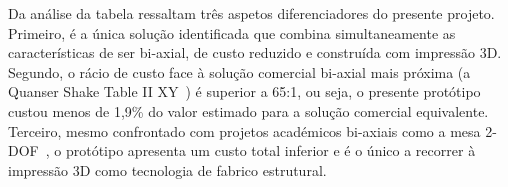 Da análise da tabela ressaltam três aspetos diferenciadores do presente projeto. Primeiro, é a única solução identificada que combina simultaneamente as características de ser bi-axial, de custo reduzido e construída com impressão 3D. Segundo, o rácio de custo face à solução comercial bi-axial mais próxima (a Quanser Shake Table II XY~\cite{QuanserShakeTableIIXY}) é superior a 65:1, ou seja, o presente protótipo custou menos de 1,9\% do valor estimado para a solução comercial equivalente. Terceiro, mesmo confrontado com projetos académicos bi-axiais como a mesa 2-DOF~\cite{2DOF2025}, o protótipo apresenta um custo total inferior e é o único a recorrer à impressão 3D como tecnologia de fabrico estrutural.
